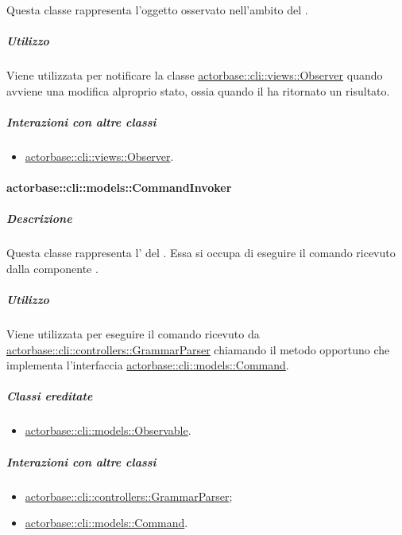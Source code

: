 \documentclass{scalatekids-article}
\begin{document}
Questa classe rappresenta l'oggetto osservato nell'ambito del  .

\subparagraph{Utilizzo}

Viene utilizzata per notificare la classe \hyperref[sec:actorbase::cli::views::Observer]{actorbase::cli::views::Observer}
quando avviene una modifica alproprio stato, ossia quando il 
ha ritornato un risultato.

\subparagraph{Interazioni con altre classi}

\begin{itemize}
\item \hyperref[sec:actorbase::cli::views::Observer]{actorbase::cli::views::Observer}.
\end{itemize}

\paragraph{actorbase::cli::models::CommandInvoker}
\label{sec:actorbase::cli::models::CommandInvoker}

\subparagraph{Descrizione}

Questa classe rappresenta l' del . Essa
si occupa di eseguire il comando ricevuto dalla componente .

\subparagraph{Utilizzo}

Viene utilizzata per eseguire il comando ricevuto da
\hyperref[sec:actorbase::cli::controllers::GrammarParser]{actorbase::cli::controllers::GrammarParser} chiamando il metodo opportuno che
implementa l'interfaccia \hyperref[sec:actorbase::cli::models::Command]{actorbase::cli::models::Command}.

\subparagraph{Classi ereditate}

\begin{itemize}
\item \hyperref[sec:actorbase::cli::models::Observable]{actorbase::cli::models::Observable}.
\end{itemize}

\subparagraph{Interazioni con altre classi}

\begin{itemize}
\item \hyperref[sec:actorbase::cli::controllers::GrammarParser]{actorbase::cli::controllers::GrammarParser};
\item \hyperref[sec:actorbase::cli::models::Command]{actorbase::cli::models::Command}.
\end{itemize}
\end{document}

